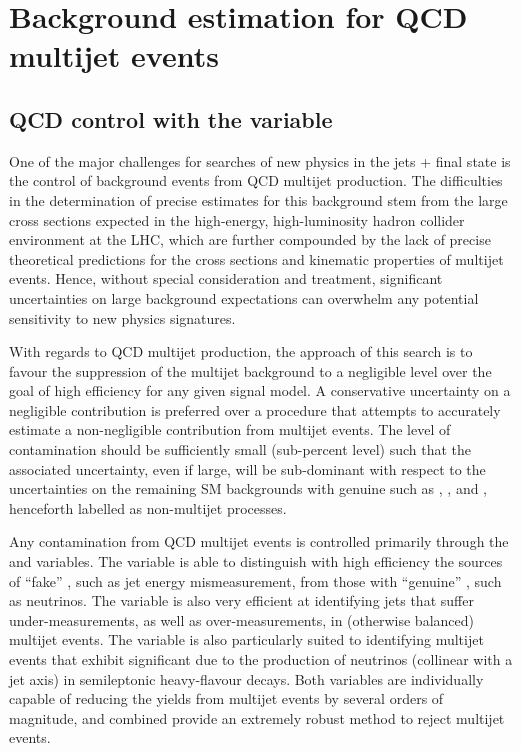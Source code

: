 \def\rmhtmet{\mbox{$\mathcal{R}$}\xspace}

\section{Background estimation for QCD multijet events \label{sec:qcd}}
\subsection{QCD control with the \bdphi variable}

One of the major challenges for searches of new physics in the jets +
\met final state is the control of background events from QCD multijet
production. The difficulties in the determination of precise estimates
for this background stem from the large cross sections expected in the
high-energy, high-luminosity hadron collider environment at the LHC,
which are further compounded by the lack of precise theoretical
predictions for the cross sections and kinematic properties of
multijet events. Hence, without special consideration and treatment,
significant uncertainties on large background expectations can
overwhelm any potential sensitivity to new physics signatures.

With regards to QCD multijet production, the approach of this search
is to favour the suppression of the multijet background to a
negligible level over the goal of high efficiency for any given signal
model. A conservative uncertainty on a negligible contribution is
preferred over a procedure that attempts to accurately estimate a
non-negligible contribution from multijet events. The level of
contamination should be sufficiently small (\ie sub-percent level)
such that the associated uncertainty, even if large, will be
sub-dominant with respect to the uncertainties on the remaining SM
backgrounds with genuine \met such as \wj, \znunu, and \ttbar,
henceforth labelled as non-multijet processes.

Any contamination from QCD multijet events is controlled primarily
through the \alphat and \bdphi variables. The \alphat variable is able
to distinguish with high efficiency the sources of ``fake'' \met, such
as jet energy mismeasurement, from those with ``genuine'' \met, such
as neutrinos. The \bdphi variable is also very efficient at
identifying jets that suffer under-measurements, as well as
over-measurements, in (otherwise balanced) multijet events. The
variable is also particularly suited to identifying multijet events
that exhibit significant \met due to the production of neutrinos
(collinear with a jet axis) in semileptonic heavy-flavour decays. Both
variables are individually capable of reducing the yields from
multijet events by several orders of magnitude, and combined provide
an extremely robust method to reject multijet events.

